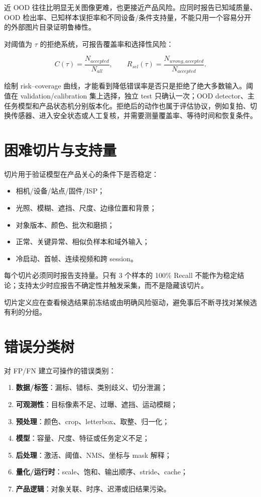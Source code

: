 近 OOD 往往比明显无关图像更难，也更接近产品风险。应同时报告已知域质量、OOD 检出率、已知样本误拒率和不同设备/条件支持量，不能只用一个容易分开的外部图片目录证明鲁棒性。

对阈值为 $\tau$ 的拒绝系统，可报告覆盖率和选择性风险：

\begin{equation}
  C(\tau)=\frac{N_{accepted}}{N_{all}},\qquad
  R_{sel}(\tau)=\frac{N_{wrong,accepted}}{N_{accepted}}.
\end{equation}

绘制 risk--coverage 曲线，才能看到降低错误率是否只是拒绝了绝大多数输入。阈值在 validation/calibration 集上选择，独立 test 只确认一次；OOD detector、主任务模型和产品状态机分别版本化。拒绝后的动作也属于评估协议，例如复拍、切换传感器、进入安全状态或人工复核，并需要测量覆盖率、等待时间和恢复条件。

\section{困难切片与支持量}

切片用于验证模型在产品关心的条件下是否稳定：

\begin{itemize}
  \item 相机/设备/站点/固件/ISP；
  \item 光照、模糊、遮挡、尺度、边缘位置和背景；
  \item 对象版本、颜色、批次和磨损；
  \item 正常、关键异常、相似负样本和域外输入；
  \item 冷启动、首帧、连续视频和跨 session。
\end{itemize}

每个切片必须同时报告支持量。只有 3 个样本的 100\% Recall 不能作为稳定结论；支持太少时应报告不确定性并触发采集，而不是隐藏该切片。

切片定义应在查看候选结果前冻结或由明确风险驱动，避免事后不断寻找对某候选有利的分组。

\section{错误分类树}

对 FP/FN 建立可操作的错误类别：

\begin{enumerate}
  \item \textbf{数据/标签}：漏标、错标、类别歧义、切分泄漏；
  \item \textbf{可观测性}：目标像素不足、过曝、遮挡、运动模糊；
  \item \textbf{预处理}：颜色、crop、letterbox、取整、归一化；
  \item \textbf{模型}：容量、尺度、特征或任务定义不足；
  \item \textbf{后处理}：激活、阈值、NMS、坐标与 mask 解释；
  \item \textbf{量化/运行时}：scale、饱和、输出顺序、stride、cache；
  \item \textbf{产品逻辑}：对象关联、时序、迟滞或旧结果污染。
\end{enumerate}

